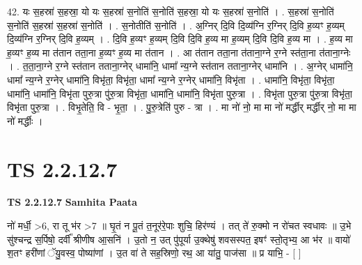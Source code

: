 \documentclass[17pt]{extarticle}
\begin{document}
42. यः स॒हस्रा॑ स॒हस्रा॒ यो यः स॒हस्रा॑ स॒नोति॑ स॒नोति॑ स॒हस्रा॒ यो यः स॒हस्रा॑ स॒नोति॑ । . स॒हस्रा॑ स॒नोति॑ स॒नोति॑ स॒हस्रा॑ स॒हस्रा॑ स॒नोति॑ । . स॒नोतीति॑ स॒नोति॑ । . अ॒ग्निर् दि॒वि दि॒व्य॑ग्नि र॒ग्निर् दि॒वि ह॒व्यꣳ ह॒व्यम् दि॒व्य॑ग्नि र॒ग्निर् दि॒वि ह॒व्यम् । . दि॒वि ह॒व्यꣳ ह॒व्यम् दि॒वि दि॒वि ह॒व्य मा ह॒व्यम् दि॒वि दि॒वि ह॒व्य मा । . ह॒व्य मा ह॒व्यꣳ ह॒व्य मा त॑तान तता॒ना ह॒व्यꣳ ह॒व्य मा त॑तान । . आ त॑तान तता॒ना त॑ताना॒ग्ने र॒ग्ने स्त॑ता॒ना त॑ताना॒ग्नेः । . त॒ता॒ना॒ग्ने र॒ग्ने स्त॑तान तताना॒ग्नेर् धामा॑नि॒ धामा᳚ न्य॒ग्ने स्त॑तान तताना॒ग्नेर् धामा॑नि । . अ॒ग्नेर् धामा॑नि॒ धामा᳚ न्य॒ग्ने र॒ग्नेर् धामा॑नि॒ विभृ॑ता॒ विभृ॑ता॒ धामा᳚ न्य॒ग्ने र॒ग्नेर् धामा॑नि॒ विभृ॑ता । . धामा॑नि॒ विभृ॑ता॒ विभृ॑ता॒ धामा॑नि॒ धामा॑नि॒ विभृ॑ता पुरु॒त्रा पु॑रु॒त्रा विभृ॑ता॒ धामा॑नि॒ धामा॑नि॒ विभृ॑ता पुरु॒त्रा । . विभृ॑ता पुरु॒त्रा पु॑रु॒त्रा विभृ॑ता॒ विभृ॑ता पुरु॒त्रा । . विभृ॒तेति॒ वि - भृ॒ता॒ । . पु॒रु॒त्रेति॑ पुरु - त्रा । . मा नो॑ नो॒ मा मा नो॑ मर्द्धीर् मर्द्धीर् नो॒ मा मा नो॑ मर्द्धीः । \newline
\pagebreak
{}

\section{ TS 2.2.12.7 }

\textbf{TS 2.2.12.7 } \newline
\textbf{Samhita Paata} \newline

नो॑ मर्धी॒ >6, रा तू भ॑र >7 ॥ घृ॒तं न पू॒तं त॒नूर॑रे॒पाः शुचि॒ हिर॑ण्यं । तत् ते॑ रु॒क्मो न रो॑चत स्वधावः ॥  उ॒भे सु॑श्चन्द्र स॒र्पिषो॒ दर्वी᳚ श्रीणीष आ॒सनि॑ । उ॒तो न॒ उत् पु॑पूर्या उ॒क्थेषु॑ शवसस्पत॒ इषꣳ॑ स्तो॒तृभ्य॒ आ भ॑र ॥ वायो॑ श॒तꣳ हरी॑णां ॅयु॒वस्व॒ पोष्या॑णां । उ॒त वा॑ ते सह॒स्रिणो॒ रथ॒ आ या॑तु॒ पाज॑सा ॥ प्र याभि॒ - [  ] \newline
\end{document}
